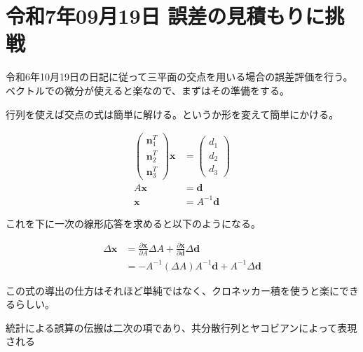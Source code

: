 
\section{令和7年09月19日 誤差の見積もりに挑戦}

令和6年10月19日の日記に従って三平面の交点を用いる場合の誤差評価を行う。ベクトルでの微分が使えると楽なので、まずはその準備をする。

行列を使えば交点の式は簡単に解ける。というか形を変えて簡単にかける。

\begin{align*}
    \begin{pmatrix}
        \bm{n}_1^T \\
        \bm{n}_2^T \\
        \bm{n}_3^T
    \end{pmatrix}
    \bm{x}
    &=
    \begin{pmatrix}
        d_1 \\
        d_2 \\
        d_3
    \end{pmatrix} \\
    A\bm{x} &= \bm{d} \\
    \bm{x} &= A^{-1}\bm{d}
\end{align*}

これを下に一次の線形応答を求めると以下のようになる。

\begin{align*}
    \Delta \bm{x} &= \frac{\partial \bm{x}}{\partial A} \Delta A + \frac{\partial \bm{x}}{\partial \bm{d}} \Delta \bm{d} \\
    &= -A^{-1}(\Delta A)A^{-1}\bm{d} + A^{-1}\Delta \bm{d}
\end{align*}

この式の導出の仕方はそれほど単純ではなく、クロネッカー積を使うと楽にできるらしい。

統計による誤算の伝搬は二次の項であり、共分散行列とヤコビアンによって表現される